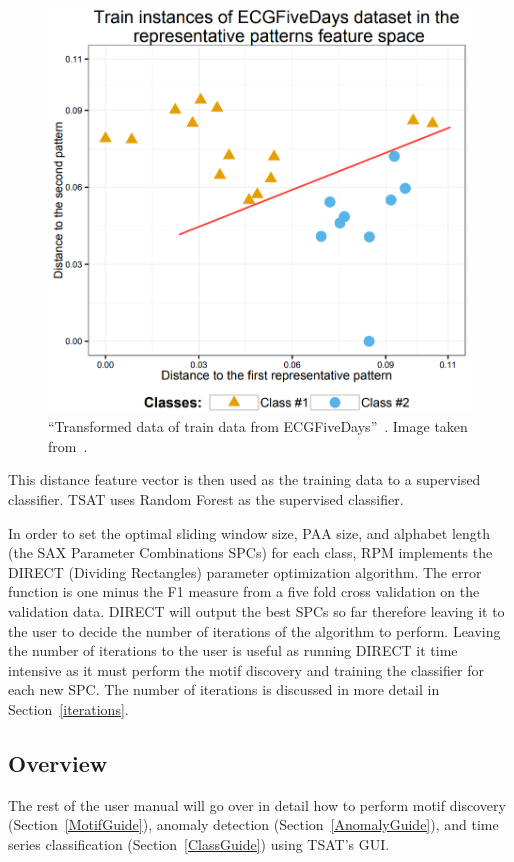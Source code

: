 \documentclass[titlepage, letterpaper, 12pt]{article}
\begin{document}
\begin{figure}[H]
	\centering
	\includegraphics[width=.7\textwidth]{pictures/featurevec}
	\caption{``Transformed data of train data from ECGFiveDays''~\cite{wang2016rpm}.  Image taken from~\cite{wang2016rpm}.}
	\label{fig:featurevec}
\end{figure}


This distance feature vector is then used as the training data to a supervised classifier. TSAT uses Random Forest as the supervised classifier.

In order to set the optimal sliding window size, PAA size, and alphabet length (the SAX Parameter Combinations SPCs) for each class, RPM implements the DIRECT (Dividing Rectangles) parameter optimization algorithm.  The error function is one minus the F1 measure from a five fold cross validation on the validation data.  DIRECT will output the best SPCs so far therefore leaving it to the user to decide the number of iterations of the algorithm to perform.  Leaving the number of iterations to the user is useful as running DIRECT it time intensive as it must perform the motif discovery and training the classifier for each new SPC.  The number of iterations is discussed in more detail in Section~\ref{iterations}.


\subsection{Overview}

The rest of the user manual will go over in detail how to perform motif discovery (Section~\ref{MotifGuide}), anomaly detection (Section~\ref{AnomalyGuide}), and time series classification (Section~\ref{ClassGuide}) using TSAT's GUI.
\end{document}
